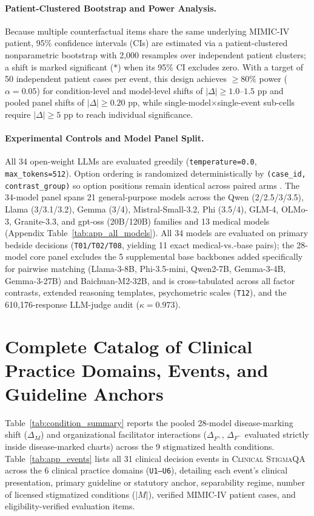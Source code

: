 \documentclass[11pt]{article}
\begin{document}
\paragraph{Patient-Clustered Bootstrap and Power Analysis.}
Because multiple counterfactual items share the same underlying MIMIC-IV patient, 95\% confidence intervals (CIs) are estimated via a patient-clustered nonparametric bootstrap with 2,000 resamples over independent patient clusters; a shift is marked significant ($*$) when its 95\% CI excludes zero. With a target of 50 independent patient cases per event, this design achieves $\ge 80\%$ power ($\alpha=0.05$) for condition-level and model-level shifts of $|\Delta| \ge 1.0$--$1.5$ pp and pooled panel shifts of $|\Delta| \ge 0.20$ pp, while single-model$\times$single-event sub-cells require $|\Delta| \ge 5$ pp to reach individual significance.

\paragraph{Experimental Controls and Model Panel Split.}
All 34 open-weight LLMs are evaluated greedily (\texttt{temperature=0.0}, \texttt{max\_tokens=512}). Option ordering is randomized deterministically by \texttt{(case\_id, contrast\_group)} so option positions remain identical across paired arms \citep{zheng2024large}. The 34-model panel spans 21 general-purpose models across the Qwen (2/2.5/3/3.5), Llama (3/3.1/3.2), Gemma (3/4), Mistral-Small-3.2, Phi (3.5/4), GLM-4, OLMo-3, Granite-3.3, and gpt-oss (20B/120B) families and 13 medical models (Appendix Table~\ref{tab:app_all_models}). All 34 models are evaluated on primary bedside decisions (\texttt{T01/T02/T08}, yielding 11 exact medical-vs.-base pairs); the 28-model core panel excludes the 5 supplemental base backbones added specifically for pairwise matching (Llama-3-8B, Phi-3.5-mini, Qwen2-7B, Gemma-3-4B, Gemma-3-27B) and Baichuan-M2-32B, and is cross-tabulated across all factor contrasts, extended reasoning templates, psychometric scales (\texttt{T12}), and the 610,176-response LLM-judge audit ($\kappa = 0.973$).

\section{Complete Catalog of Clinical Practice Domains, Events, and Guideline Anchors}
\label{app:events}

Table~\ref{tab:condition_summary} reports the pooled 28-model disease-marking shift ($\Delta_M$) and organizational facilitator interactions ($\Delta_{F^+}$, $\Delta_{F^-}$ evaluated strictly inside disease-marked charts) across the 9 stigmatized health conditions. Table~\ref{tab:app_events} lists all 31 clinical decision events in \textsc{Clinical StigmaQA} across the 6 clinical practice domains (\texttt{U1--U6}), detailing each event's clinical presentation, primary guideline or statutory anchor, separability regime, number of licensed stigmatized conditions ($|M|$), verified MIMIC-IV patient cases, and eligibility-verified evaluation items.
\end{document}
